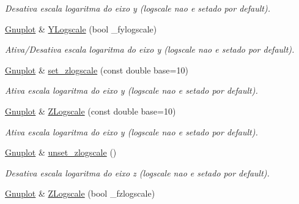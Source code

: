 \begin{DoxyCompactItemize}
\begin{DoxyCompactList}\small\item\em Desativa escala logaritma do eixo y (logscale nao e setado por default). \end{DoxyCompactList}\item 
\hypertarget{classGnuplot_a6ab94815fbf0fabfa108cf659079828f}{\hyperlink{classGnuplot}{Gnuplot} \& \hyperlink{classGnuplot_a6ab94815fbf0fabfa108cf659079828f}{Y\-Logscale} (bool \-\_\-fylogscale)}\label{classGnuplot_a6ab94815fbf0fabfa108cf659079828f}

\begin{DoxyCompactList}\small\item\em Ativa/\-Desativa escala logaritma do eixo y (logscale nao e setado por default). \end{DoxyCompactList}\item 
\hypertarget{classGnuplot_a1da3838163b0dbde8809b55c5b5c56b1}{\hyperlink{classGnuplot}{Gnuplot} \& \hyperlink{classGnuplot_a1da3838163b0dbde8809b55c5b5c56b1}{set\-\_\-zlogscale} (const double base=10)}\label{classGnuplot_a1da3838163b0dbde8809b55c5b5c56b1}

\begin{DoxyCompactList}\small\item\em Ativa escala logaritma do eixo y (logscale nao e setado por default). \end{DoxyCompactList}\item 
\hypertarget{classGnuplot_a4a875f9e3f43e22d30be8e52c33df620}{\hyperlink{classGnuplot}{Gnuplot} \& \hyperlink{classGnuplot_a4a875f9e3f43e22d30be8e52c33df620}{Z\-Logscale} (const double base=10)}\label{classGnuplot_a4a875f9e3f43e22d30be8e52c33df620}

\begin{DoxyCompactList}\small\item\em Ativa escala logaritma do eixo y (logscale nao e setado por default). \end{DoxyCompactList}\item 
\hypertarget{classGnuplot_a294d7473091f849fe70e4dba8df8712a}{\hyperlink{classGnuplot}{Gnuplot} \& \hyperlink{classGnuplot_a294d7473091f849fe70e4dba8df8712a}{unset\-\_\-zlogscale} ()}\label{classGnuplot_a294d7473091f849fe70e4dba8df8712a}

\begin{DoxyCompactList}\small\item\em Desativa escala logaritma do eixo z (logscale nao e setado por default). \end{DoxyCompactList}\item 
\hypertarget{classGnuplot_af0157431e784eead31de6eb4e3e5d095}{\hyperlink{classGnuplot}{Gnuplot} \& \hyperlink{classGnuplot_af0157431e784eead31de6eb4e3e5d095}{Z\-Logscale} (bool \-\_\-fzlogscale)}\label{classGnuplot_af0157431e784eead31de6eb4e3e5d095}


\end{DoxyCompactItemize}
